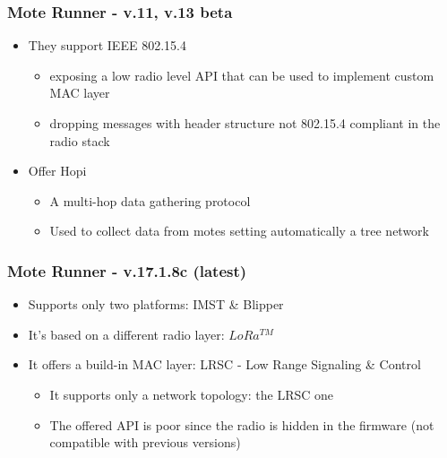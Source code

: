 \documentclass[12pt, compress]{beamer}
\begin{document}
\begin{frame}[fragile]
  \frametitle{Mote Runner - v.11, v.13 beta}
  \begin{itemize}
    \item They support IEEE 802.15.4
    \begin{itemize}
    	\item exposing a low radio level API that can be used to implement custom MAC layer
    	\item dropping messages with header structure not 802.15.4 compliant in the radio stack 
    \end{itemize}
    \item Offer Hopi
    \begin{itemize}
    	\item A multi-hop data gathering protocol
    	\item Used to collect data from motes setting automatically a tree network
    \end{itemize}
  \end{itemize}
\end{frame}

\begin{frame}[fragile]
  \frametitle{Mote Runner - v.17.1.8c (latest)}
  \begin{itemize}
    \item Supports only two platforms: IMST \& Blipper
    \item It’s based on a different radio layer: $LoRa^{TM}$
    \item It offers a build-in MAC layer: LRSC - Low Range Signaling \& Control
    \begin{itemize}
    	\item It supports only a network topology: the LRSC one
    	\item The offered API is poor since the radio is hidden in the firmware (not compatible with previous versions)
    \end{itemize}

  \end{itemize}
\end{frame}
\end{document}
